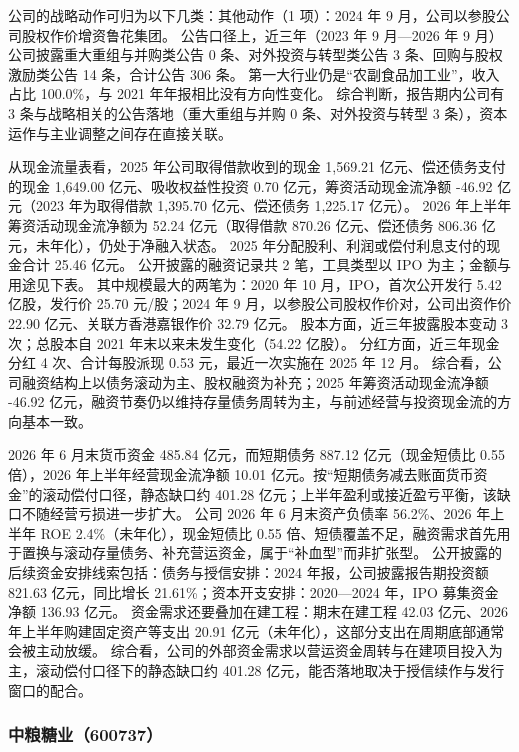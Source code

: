  公司的战略动作可归为以下几类：其他动作（1 项）：2024 年 9 月，公司以参股公司股权作价增资鲁花集团。 公告口径上，近三年（2023 年 9 月---2026 年 9 月）公司披露重大重组与并购类公告 0 条、对外投资与转型类公告 3 条、回购与股权激励类公告 14 条，合计公告 306 条。 第一大行业仍是“农副食品加工业”，收入占比 100.0\%，与 2021 年年报相比没有方向性变化。 综合判断，报告期内公司有 3 条与战略相关的公告落地（重大重组与并购 0 条、对外投资与转型 3 条），资本运作与主业调整之间存在直接关联。

 从现金流量表看，2025 年公司取得借款收到的现金 1,569.21 亿元、偿还债务支付的现金 1,649.00 亿元、吸收权益性投资 0.70 亿元，筹资活动现金流净额 -46.92 亿元（2023 年为取得借款 1,395.70 亿元、偿还债务 1,225.17 亿元）。 2026 年上半年筹资活动现金流净额为 52.24 亿元（取得借款 870.26 亿元、偿还债务 806.36 亿元，未年化），仍处于净融入状态。 2025 年分配股利、利润或偿付利息支付的现金合计 25.46 亿元。 公开披露的融资记录共 2 笔，工具类型以 IPO 为主；金额与用途见下表。 其中规模最大的两笔为：2020 年 10 月，IPO，首次公开发行 5.42 亿股，发行价 25.70 元/股；2024 年 9 月，以参股公司股权作价对，公司出资作价 22.90 亿元、关联方香港嘉银作价 32.79 亿元。 股本方面，近三年披露股本变动 3 次；总股本自 2021 年末以来未发生变化（54.22 亿股）。 分红方面，近三年现金分红 4 次、合计每股派现 0.53 元，最近一次实施在 2025 年 12 月。 综合看，公司融资结构上以债务滚动为主、股权融资为补充；2025 年筹资活动现金流净额 -46.92 亿元，融资节奏仍以维持存量债务周转为主，与前述经营与投资现金流的方向基本一致。

 2026 年 6 月末货币资金 485.84 亿元，而短期债务 887.12 亿元（现金短债比 0.55 倍），2026 年上半年经营现金流净额 10.01 亿元。按“短期债务减去账面货币资金”的滚动偿付口径，静态缺口约 401.28 亿元；上半年盈利或接近盈亏平衡，该缺口不随经营亏损进一步扩大。 公司 2026 年 6 月末资产负债率 56.2\%、2026 年上半年 ROE 2.4\%（未年化），现金短债比 0.55 倍、短债覆盖不足，融资需求首先用于置换与滚动存量债务、补充营运资金，属于“补血型”而非扩张型。 公开披露的后续资金安排线索包括：债务与授信安排：2024 年报，公司披露报告期投资额 821.63 亿元，同比增长 21.61\%；资本开支安排：2020---2024 年，IPO 募集资金净额 136.93 亿元。 资金需求还要叠加在建工程：期末在建工程 42.03 亿元、2026 年上半年购建固定资产等支出 20.91 亿元（未年化），这部分支出在周期底部通常会被主动放缓。 综合看，公司的外部资金需求以营运资金周转与在建项目投入为主，滚动偿付口径下的静态缺口约 401.28 亿元，能否落地取决于授信续作与发行窗口的配合。




\subsubsection{中粮糖业（600737）}
\label{co:600737}

